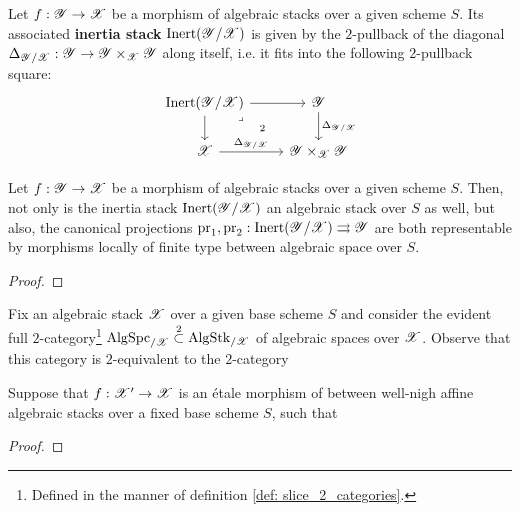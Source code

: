            \begin{definition} \label{def: inertia_stacks}
                Let $f: \mathscr{Y} \to \mathscr{X}$ be a morphism of algebraic stacks over a given scheme $S$. Its associated \textbf{inertia stack} $\mathrm{Inert}(\mathscr{Y}/\mathscr{X})$ is given by the $2$-pullback of the diagonal $\Delta_{\scrY/\scrX}: \scrY \to \scrY \x_{\scrX} \scrY$ along itself, i.e. it fits into the following $2$-pullback square:
                    $$
                        \begin{tikzcd}
                        	{\Inert(\scrY/\scrX)} & \scrY \\
                        	\scrX & {\scrY \x_{\scrX} \scrY}
                        	\arrow["{\Delta_{\scrY/\scrX}}", from=2-1, to=2-2]
                        	\arrow["{\Delta_{\scrY/\scrX}}", from=1-2, to=2-2]
                        	\arrow[from=1-1, to=2-1]
                        	\arrow[from=1-1, to=1-2]
                        	\arrow["2"{description}, "\lrcorner"{anchor=center, pos=0.125}, draw=none, from=1-1, to=2-2]
                        \end{tikzcd}
                    $$
            \end{definition}
            \begin{proposition} \label{prop: properties_of_inertia_stacks}
                Let $f: \mathscr{Y} \to \mathscr{X}$ be a morphism of algebraic stacks over a given scheme $S$. Then, not only is the inertia stack $\mathrm{Inert}(\mathscr{Y}/\mathscr{X})$ an algebraic stack over $S$ as well, but also, the canonical projections $\operatorname{pr}_1, \operatorname{pr}_2: \mathrm{Inert}(\mathscr{Y}/\mathscr{X}) \rightrightarrows \mathscr{Y}$ are both representable by morphisms locally of finite type between algebraic space over $S$. 
            \end{proposition}
                \begin{proof}
                    
                \end{proof}
            \begin{remark} \label{remark: inertia_and_automorphisms}
                Fix an algebraic stack $\mathscr{X}$ over a given base scheme $S$ and consider the evident full $2$-category\footnote{Defined in the manner of definition \ref{def: slice_2_categories}.} $\mathrm{Alg}\mathrm{Spc}_{/\mathscr{X}} \overset{2}{\subset} \mathrm{Alg}\mathrm{Stk}_{/\mathscr{X}}$ of algebraic spaces over $\mathscr{X}$. Observe that this category is $2$-equivalent to the $2$-category 
            \end{remark}
            \begin{lemma}
                Suppose that $f: \mathscr{X}' \to \mathscr{X}$ is an \'etale morphism of between well-nigh affine algebraic stacks over a fixed base scheme $S$, such that 
            \end{lemma}
                \begin{proof}
                    
                \end{proof}
                
